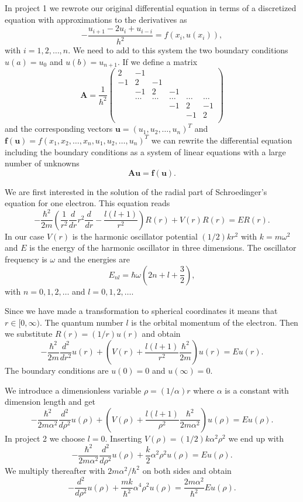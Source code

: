 \documentclass[%
oneside,                 %
final,                   %
10pt]{article}
\begin{document}
In project 1 we rewrote our original differential equation in terms of a discretized equation with approximations to the 
derivatives as
\[
    -\frac{u_{i+1} -2u_i +u_{i-i}}{h^2}=f(x_i,u(x_i)),
\]
with $i=1,2,\dots, n$. We need to add to this system the two boundary conditions $u(a) =u_0$ and $u(b) = u_{n+1}$.
If we define a matrix
\[
    \mathbf{A} = \frac{1}{h^2}\left(\begin{array}{cccccc}
                          2 & -1 &  &   &  & \\
                          -1 & 2 & -1 & & & \\
                           & -1 & 2 & -1 & &  \\
                           & \dots   & \dots &\dots   &\dots & \dots \\
                           &   &  &-1  &2& -1 \\
                           &    &  &   &-1 & 2 \\
                      \end{array} \right)
\]
and the corresponding vectors $\mathbf{u} = (u_1, u_2, \dots,u_n)^T$ and 
$\mathbf{f}(\mathbf{u}) = f(x_1,x_2,\dots, x_n,u_1, u_2, \dots,u_n)^T$  we can rewrite the differential equation
including the boundary conditions as a system of linear equations with  a large number of unknowns 
\[
   \mathbf{A}\mathbf{u} = \mathbf{f}(\mathbf{u}).
 \]

We are first interested in the solution of the radial part of Schroedinger's equation for one electron. This equation reads
\[
  -\frac{\hbar^2}{2 m} \left ( \frac{1}{r^2} \frac{d}{dr} r^2
  \frac{d}{dr} - \frac{l (l + 1)}{r^2} \right )R(r) 
     + V(r) R(r) = E R(r).
\]
In our case $V(r)$ is the harmonic oscillator potential $(1/2)kr^2$ with
$k=m\omega^2$ and $E$ is
the energy of the harmonic oscillator in three dimensions.
The oscillator frequency is $\omega$ and the energies are
\[
E_{nl}=  \hbar \omega \left(2n+l+\frac{3}{2}\right),
\]
with $n=0,1,2,\dots$ and $l=0,1,2,\dots$.

Since we have made a transformation to spherical coordinates it means that 
$r\in [0,\infty)$.  
The quantum number
$l$ is the orbital momentum of the electron.   Then we substitute $R(r) = (1/r) u(r)$ and obtain
\[
  -\frac{\hbar^2}{2 m} \frac{d^2}{dr^2} u(r) 
       + \left ( V(r) + \frac{l (l + 1)}{r^2}\frac{\hbar^2}{2 m}
                                    \right ) u(r)  = E u(r) .
\]
The boundary conditions are $u(0)=0$ and $u(\infty)=0$.

We introduce a dimensionless variable $\rho = (1/\alpha) r$
where $\alpha$ is a constant with dimension length and get
\[
  -\frac{\hbar^2}{2 m \alpha^2} \frac{d^2}{d\rho^2} u(\rho) 
       + \left ( V(\rho) + \frac{l (l + 1)}{\rho^2}
         \frac{\hbar^2}{2 m\alpha^2} \right ) u(\rho)  = E u(\rho) .
\]
In project 2 we choose $l=0$.
Inserting $V(\rho) = (1/2) k \alpha^2\rho^2$ we end up with
\[
  -\frac{\hbar^2}{2 m \alpha^2} \frac{d^2}{d\rho^2} u(\rho) 
       + \frac{k}{2} \alpha^2\rho^2u(\rho)  = E u(\rho) .
\]
We multiply thereafter with $2m\alpha^2/\hbar^2$ on both sides and obtain
\[
  -\frac{d^2}{d\rho^2} u(\rho) 
       + \frac{mk}{\hbar^2} \alpha^4\rho^2u(\rho)  = \frac{2m\alpha^2}{\hbar^2}E u(\rho) .
\]
\end{document}
